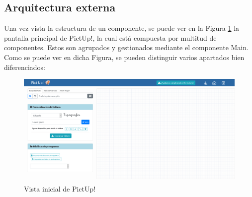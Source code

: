 \subsection{Arquitectura externa}

Una vez vista la estructura de un componente, se puede ver en la Figura \ref{fig:pantallaprincipal} la pantalla principal de PictUp!, la cual está compuesta por multitud de componentes. Estos son agrupados y gestionados mediante el componente Main. Como se puede ver en dicha Figura, se pueden distinguir varios apartados bien diferenciados: 

\begin{figure}[h!]
	\centering
	\includegraphics[width=\linewidth]{Imagenes/Bitmap/pantallaprincipal}
	\caption{Vista inicial de PictUp!
	}
	\label{fig:pantallaprincipal}
\end{figure}

